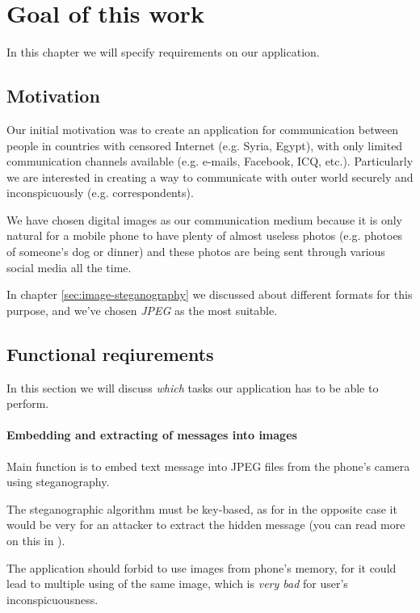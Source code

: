 \chapter{Goal of this work}
\label{ch:goal}

In this chapter we will specify requirements on our application.

\section{Motivation}

Our initial motivation was to create an application for communication between
people in countries with censored Internet (e.g. Syria, Egypt), with only limited communication channels
available (e.g. e-mails, Facebook, ICQ, etc.). Particularly we are interested in
creating a way to communicate with outer world securely and inconspicuously 
(e.g. correspondents).

We have chosen digital images as our communication medium because it is only natural for
a mobile phone to have plenty of almost useless photos (e.g. photoes of someone's dog or dinner)
and these photos are being sent through various social media all the time.

In chapter \ref{sec:image-steganography} we discussed about different formats for
this purpose, and we've chosen \emph{JPEG} as the most suitable.

\section{Functional reqiurements}
In this section we will discuss \emph{which} tasks our application has to be able to perform.

\subsubsection{Embedding and extracting of messages into images}
Main function is to embed text message into JPEG files from the phone's camera using steganography.

The steganographic algorithm must be key-based, as for in the opposite case it would be very for an attacker
to extract the hidden message (you can read more on this in \cite{Ostertag1996}).

The application should forbid to use images from phone's memory, for it could lead to multiple 
using of the same image, which is \emph{very bad} for user's inconspicuousness.

